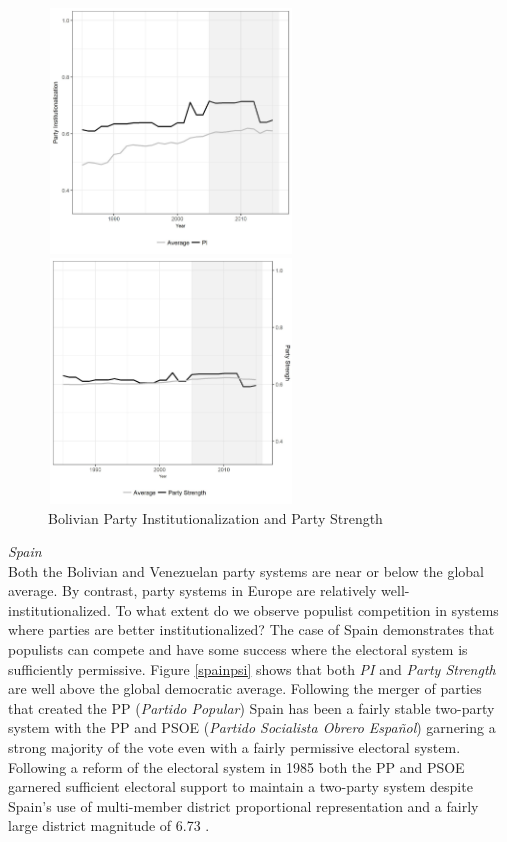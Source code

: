 \documentclass[a4paper,12pt]{article}\usepackage[]{graphicx}\usepackage[]{color}
\begin{document}
     \par
\begin{figure}[H]
\centering
\parbox{2.5in}{\includegraphics[width=65mm, height=65mm]{bolivia1.jpg}}%
\qquad
\begin{minipage}{2in}%
\includegraphics[width=65mm, height=65mm]{bolivia2.jpg}
\end{minipage}%
\caption{Bolivian Party Institutionalization and Party Strength}%
\label{boliviapsi}%

\end{figure}
  \noindent 
\textit{Spain} \\
Both the Bolivian and Venezuelan party systems are near or below the global average. By contrast, party systems in  Europe are relatively well-institutionalized. To what extent do we observe populist competition in systems where parties are better institutionalized? The case of Spain demonstrates that populists can compete and have some success where the electoral system is sufficiently permissive. Figure \ref{spainpsi} shows that both \textit{PI} and \textit{Party Strength} are well above the global democratic average. Following the merger of parties that created the PP (\textit{Partido Popular}) Spain has been a fairly stable two-party system with the PP and PSOE (\textit{Partido Socialista Obrero Espa\~{n}ol}) garnering a strong majority of the vote even with a fairly permissive electoral system. Following a reform of the electoral system in 1985 both the PP and PSOE garnered sufficient electoral support to maintain a two-party system despite Spain's use of multi-member district proportional representation and a fairly large district magnitude of 6.73 \citep{selway2016system}.
\end{document}
